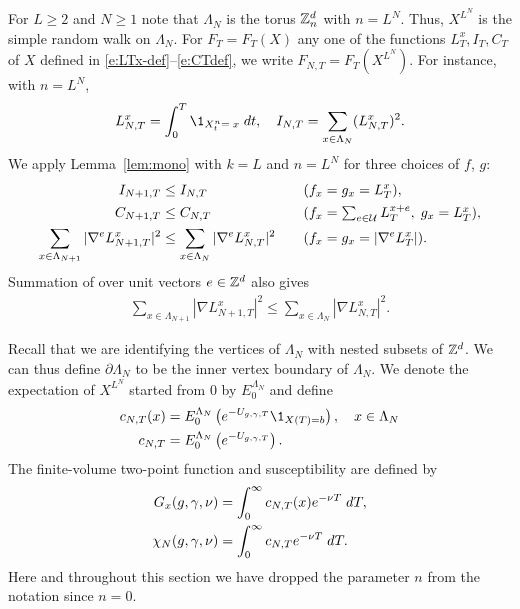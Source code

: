 For $L \geq 2$ and $N \geq 1$
note that $\Lambda_N$ is the torus ${\mathbb Z}^d_n$ with $n=L^N$.
Thus, $X^{L^N}$ is the simple random walk on $\Lambda_N$.
For $F_T = F_T(X)$ any one of the functions $L_T^x,I_T,C_T$
of $X$ defined in \eqref{e:LTx-def}--\eqref{e:CTdef},
we write $F_{N,T} = F_T(X^{L^N})$. For instance, with $n=L^N$,
\begin{equation}
    L^x_{N,T} = \int_0^T \1_{X^{n}_t=\;x} \; dt,
    \quad I_{N,T} = \sum_{x \in \Lambda_N}(L_{N,T}^x)^2 .
\end{equation}
We apply Lemma~\ref{lem:mono} with $k = L$ and $n = L^N$ for three
choices of $f$, $g$:
\begin{alignat}{2}
\label{e:ILT-mon}
I_{N+1,T} &\leq I_{N,T}
	\quad
&&(f_x=g_x=L_T^x),
	\\
\label{e:CSA-mon}
C_{N+1,T} &\leq C_{N,T}
	\quad
&&(f_x=\textstyle{\sum_{e\in \Ucal}L_T^{x+e}},\; g_x=L_T^x),
	\\
\lbeq{nabL}
\sum_{x\in\Lambda_{N+1}} |\nabla^e L^x_{N+1,T}|^2
	&\leq
\sum_{x\in\Lambda_N} |\nabla^e L^x_{N,T}|^2
	\quad
&& (f_x = g_x = \left|\nabla^e L_T^x\right|).
\end{alignat}
Summation of  over unit vectors $e\in{ {{\mathbb Z}}^d }$ also gives
\begin{align}
\label{e:gradLT-mon}
\sum_{x\in\Lambda_{N+1}} |\nabla L^x_{N+1,T}|^2
  \leq
\sum_{x\in\Lambda_N} |\nabla L^x_{N,T}|^2.
\end{align}

Recall that we are identifying the vertices of $\Lambda_N$ with nested subsets of ${ {{\mathbb Z}}^d }$.
We can thus define $\partial \Lambda_N$ to be the inner vertex boundary of $\Lambda_N$.
We denote the expectation of $X^{L^N}$ started from $0$ by $E^{\Lambda_N}_0$
and define
\begin{align}
\label{e:cN}
c_{N,T}(x)
    &=
E^{\Lambda_N}_0 \left( e^{-U_{\gcc,\gamma,T}} \1_{X(T)=b} \right),
	\quad
x \in \Lambda_N \\
c_{N,T}
    &=
E^{\Lambda_N}_0 \left( e^{-U_{\gcc,\gamma,T}} \right).
\end{align}
The finite-volume two-point function and susceptibility
are defined by
\begin{align}
G_x(g,\gamma,\nu)
    &= \int_0^\infty c_{N,T}(x) e^{-\nu T} \; dT, \\
\chi_N(g, \gamma, \nu)
    &= \int_0^\infty c_{N,T} e^{-\nu T} \; dT
    .
    \label{e:chiNdef}
\end{align}
Here and throughout this section we have dropped the parameter $n$
from the notation since $n = 0$.

